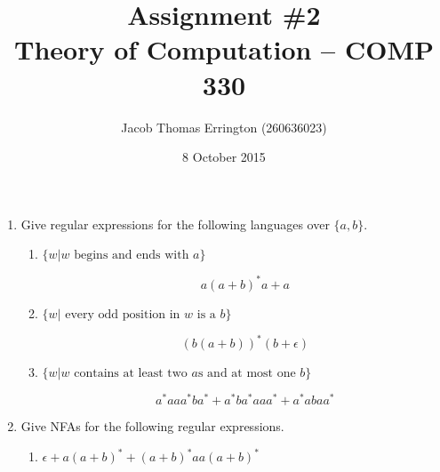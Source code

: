 \documentclass[letterpaper,11pt]{article}
\author{Jacob Thomas Errington (260636023)}
\title{Assignment \#2 \\ Theory of Computation -- COMP 330}
\date{8 October 2015}
\begin{document}
\begin{enumerate}
    \item
        Give regular expressions for the following languages over $\{a, b\}$.

        \begin{enumerate}
            \item $\{w | w \text{ begins and ends with } a\}$

                $$
                a(a + b)^*a + a
                $$

            \item $\{w | \text{ every odd position in $w$ is a } b\}$

                $$
                (b(a + b))^*(b + \epsilon)
                $$

            \item 
                $\{w | w \text{ contains at least two $a$s and at most one $b$}\}$

                $$
                a^*aaa^*ba^* + a^*ba^*aaa^* + a^*abaa^*
                $$
        \end{enumerate}

    \item
        Give NFAs for the following regular expressions.

        \begin{enumerate}
            \item
                $\epsilon + a(a + b)^* + (a + b)^*aa(a + b)^*$

                \begin{figure}[H]
                    \centering

                \end{figure}


\end{enumerate}
\end{enumerate}
\end{document}
